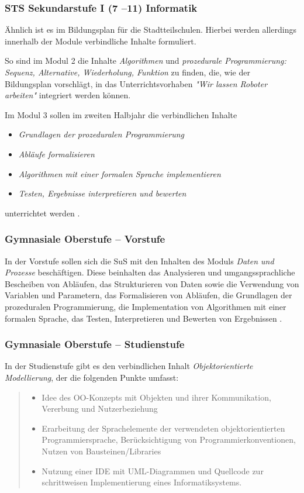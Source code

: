 \documentclass[paper=a4, DIV=14, BCOR=15mm, twoside=on, onecolumn=on, open = right, titlepage =on, parskip =half, headsepline = on, footsepline = on, chapterprefix = on, appendixprefix = off, fontsize = 12pt, numbers = noenddot, abstract = on]{scrbook}
\begin{document}
\subsubsection{STS Sekundarstufe I (7 --11) Informatik}
Ähnlich ist es im Bildungsplan für die Stadtteilschulen. Hierbei werden allerdings innerhalb der Module verbindliche Inhalte formuliert.

So sind im Modul 2 die Inhalte \emph{Algorithmen} und \emph{prozedurale Programmierung: Sequenz, Alternative, Wiederholung, Funktion} zu finden, die, wie der Bildungsplan vorschlägt, in das Unterrichtsvorhaben \emph{"Wir lassen Roboter arbeiten"} integriert werden können.

Im Modul 3 sollen im zweiten Halbjahr die verbindlichen Inhalte
\begin{itemize}
\item \emph{Grundlagen der prozeduralen Programmierung}
\item \emph{Abläufe formalisieren}
\item \emph{Algorithmen mit einer formalen Sprache implementieren}
\item \emph{Testen, Ergebnisse interpretieren und bewerten}
\end{itemize}
unterrichtet werden \cite{stsmittel:14}. 


\subsubsection{Gymnasiale Oberstufe -- Vorstufe}

In der Vorstufe sollen sich die SuS mit den Inhalten des Moduls \emph{Daten und Prozesse} beschäftigen. Diese beinhalten das Analysieren und umgangssprachliche Bescheiben von Abläufen, das Strukturieren von Daten sowie die Verwendung von Variablen und Parametern, das Formalisieren von Abläufen, die Grundlagen der prozeduralen Programmierung, die Implementation von Algorithmen mit einer formalen Sprache, das Testen, Interpretieren und Bewerten von Ergebnissen \cite{oberstufe:09}. 

\subsubsection{Gymnasiale Oberstufe -- Studienstufe}

In der Studienstufe gibt es den verbindlichen Inhalt \emph{Objektorientierte Modellierung}, der die folgenden Punkte umfasst:\\
\begin{quote}
\begin{itemize}
\item Idee des OO-Konzepts mit Objekten und ihrer Kommunikation, Vererbung und Nutzerbeziehung
\item Erarbeitung der Sprachelemente der verwendeten objektorientierten Programmiersprache, Berücksichtigung von Programmierkonventionen, Nutzen von Bausteinen/Libraries
\item Nutzung einer IDE mit UML-Diagrammen und Quellcode zur schrittweisen Implementierung eines Informatiksystems. \qquad \cite{oberstufe:09}
\end{itemize}
\end{quote}
\end{document}

